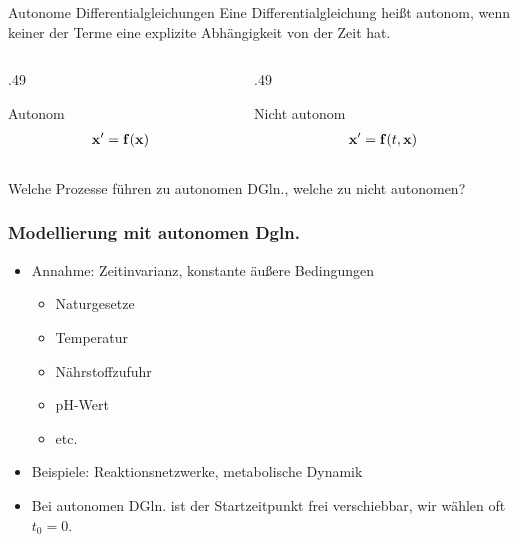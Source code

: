 \begin{frame}
  \begin{block}{Autonome Differentialgleichungen}
    Eine Differentialgleichung heißt autonom, wenn keiner der Terme
    eine explizite Abhängigkeit von der Zeit hat.
  \end{block}
  \begin{columns}
    \begin{column}[t]{.49\textwidth}
      \begin{block}{Autonom}
        \begin{gather*}
          \mathbf{x}' = \mathbf{f}(\mathbf{x})
        \end{gather*}
      \end{block}
    \end{column}
    \begin{column}[t]{.49\textwidth}
      \begin{block}{Nicht autonom}
        \begin{gather*}
          \mathbf{x}' = \mathbf{f}(t,\mathbf{x})
        \end{gather*}
      \end{block}
    \end{column}
  \end{columns}
  \pause
  \begin{Denkpause}
    Welche Prozesse führen zu autonomen DGln., welche zu nicht autonomen?
  \end{Denkpause}
\end{frame}

\begin{frame}
  \frametitle<presentation>{Modellierung mit autonomen Dgln.}
  \begin{itemize}
  \item Annahme: Zeitinvarianz,  konstante äußere Bedingungen
    \begin{itemize}
    \item Naturgesetze
    \item Temperatur
    \item Nährstoffzufuhr
    \item pH-Wert
    \item etc.
    \end{itemize}
  \item Beispiele: Reaktionsnetzwerke, metabolische Dynamik
  \item Bei autonomen DGln. ist der Startzeitpunkt frei
  verschiebbar, wir wählen oft $t_0 = 0$.
  \end{itemize}
\end{frame}


